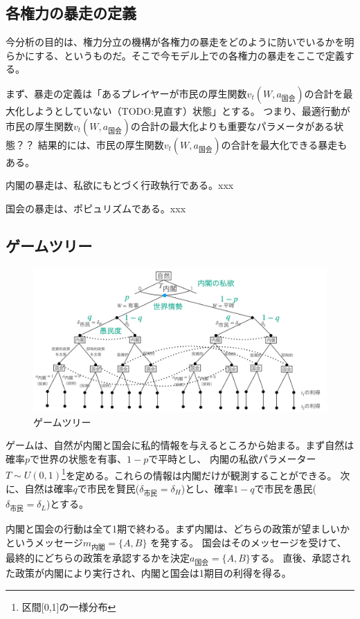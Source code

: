 \documentclass[main.tex]{subfiles}
\begin{document}
\subsection{各権力の暴走の定義}
今分析の目的は、権力分立の機構が各権力の暴走をどのように防いでいるかを明らかにする、というものだ。そこで今モデル上での各権力の暴走をここで定義する。

まず、暴走の定義は「あるプレイヤーが市民の厚生関数$v_t(W, a_{国会})$の合計を最大化しようとしていない（TODO:見直す）状態」とする。
つまり、最適行動が市民の厚生関数$v_t(W, a_{国会})$の合計の最大化よりも重要なパラメータがある状態？？
結果的には、市民の厚生関数$v_t(W, a_{国会})$の合計を最大化できる暴走もある。

内閣の暴走は、私欲にもとづく行政執行である。xxx

国会の暴走は、ポピュリズムである。xxx



\subsection{ゲームツリー}

\begin{figure}[htbp]
  \centering
  \includegraphics[width=1\textwidth]{./image/game_tree.jpg}
  \caption{ゲームツリー} 
  \label{fig:game_tree}
\end{figure}



ゲームは、自然が内閣と国会に私的情報を与えるところから始まる。まず自然は確率$p$で世界の状態を有事、$1-p$で平時とし、
内閣の私欲パラメーター$T\sim U(0,1)$\footnote{区間[0,1]の一様分布}を定める。これらの情報は内閣だけが観測することができる。
次に、自然は確率$q$で市民を賢民($\delta_{市民}=\delta_H$)とし、確率$1-q$で市民を愚民($\delta_{市民}=\delta_L$)とする。

内閣と国会の行動は全て1期で終わる。まず内閣は、どちらの政策が望ましいかというメッセージ$m_{内閣} = \lbrace A, B \rbrace$ を発する。
国会はそのメッセージを受けて、最終的にどちらの政策を承認するかを決定$a_{国会} = \lbrace A, B\rbrace$する。
直後、承認された政策が内閣により実行され、内閣と国会は1期目の利得を得る。
\end{document}
